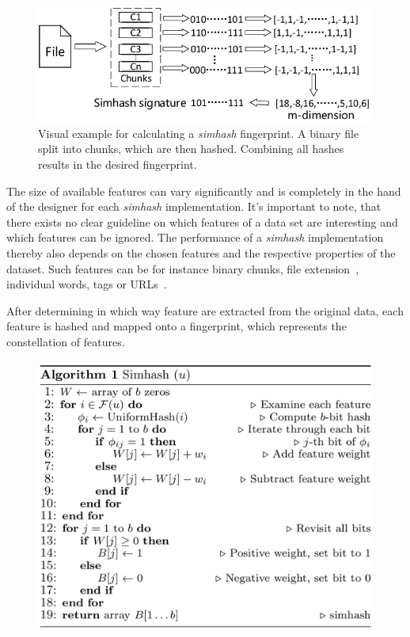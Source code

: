 \documentclass[12pt,a4paper,DIV=calc]{scrartcl}
\begin{document}
\begin{figure}[H]
    \includegraphics[scale=0.5]{./gfx/binary_chunk_fingerprint}
    \centering
    \caption{Visual example for calculating a \emph{simhash} fingerprint.
        A binary file split into chunks, which are then hashed.
    Combining all hashes results in the desired fingerprint.~\cite{article:sampling-similarity}}\label{fig:simhash-example}
\end{figure}

The size of available features can vary significantly and is completely in the hand of the designer for each \emph{simhash} implementation.
It's important to note, that there exists no clear guideline on which features of a data set are interesting and which features can be ignored.
The performance of a \emph{simhash} implementation thereby also depends on the chosen features and the respective properties of the dataset.
Such features can be for instance binary chunks, file extension~\cite{inproc:simhash}, individual words, tags or URLs~\cite{inproc:main}.

After determining in which way feature are extracted from the original data, each feature is hashed and mapped onto a fingerprint, which represents the constellation of features.

\begin{figure}[h]
    \includegraphics[scale=0.4]{./gfx/pseudocode.png}
    \centering
\end{figure}
\end{document}
